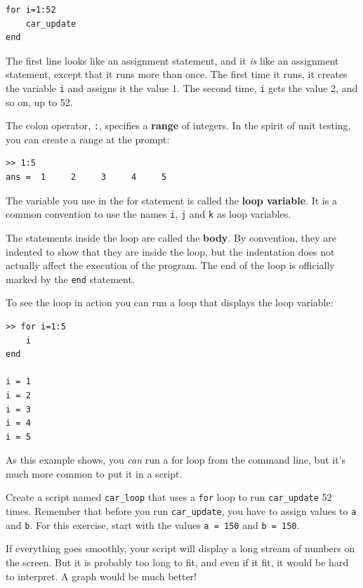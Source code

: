 \documentclass{book}
\begin{document}
\begin{verbatim}
for i=1:52
    car_update
end
\end{verbatim}

The first line looks like an assignment statement, and it {\em is}
like an assignment statement, except that it runs more than once.  The
first time it runs, it creates the variable {\tt i} and assigns it the
value 1.  The second time, {\tt i} gets the value 2, and so on, up to
52.

The colon operator, {\tt :}, specifies a {\bf range} of integers.  In
the spirit of unit testing, you can create a range at the prompt:

\begin{verbatim}
>> 1:5
ans =  1     2     3     4     5
\end{verbatim}

The variable you use in the for statement is called the {\bf loop
variable}.  It is a common convention to use the names {\tt i},
{\tt j} and {\tt k} as loop variables.

The statements inside the loop are called the {\bf body}.  By convention,
they are indented to show that they are inside the loop, but the
indentation does not actually affect the execution of the program.
The end of the loop is officially marked by the {\tt end} statement.

To see the loop in action you can run a loop that displays the
loop variable:

\begin{verbatim}
>> for i=1:5
    i
end

i = 1
i = 2
i = 3
i = 4
i = 5
\end{verbatim}

As this example shows, you {\em can} run a for loop from the
command line, but it's much more common to put it in a script.

\begin{ex}
Create a script named {\tt car\_loop} that uses a {\tt for}
loop to run {\tt car\_update} 52 times.  Remember that before you run
{\tt car\_update}, you have to assign values to {\tt a} and {\tt b}.
For this exercise, start with the values {\tt a = 150} and {\tt b =
150}.

If everything goes smoothly, your script will display a long stream
of numbers on the screen.  But it is probably too long
to fit, and even if it fit, it would be hard to interpret.
A graph would be much better!
\end{ex}
\end{document}

